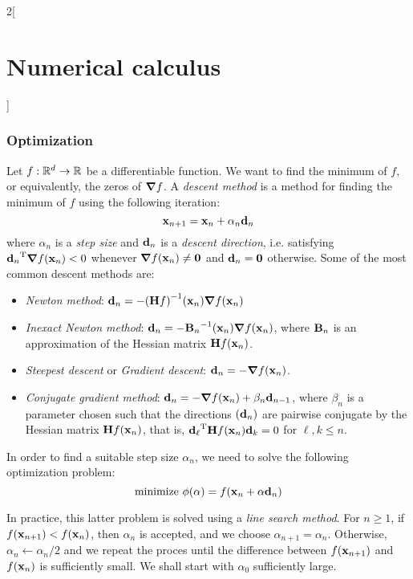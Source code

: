 \documentclass[../../../main_math.tex]{subfiles}
\begin{document}
\begin{multicols}{2}[\section{Numerical calculus}]
  \subsubsection{Optimization}
  \begin{definition}
    Let $f:\mathbb{R}^d\rightarrow\mathbb{R}$ be a differentiable function. We want to find the minimum of $f$, or equivalently, the zeros of $\grad f$. A \emph{descent method} is a method for finding the minimum of $f$ using the following iteration:
    $$
      \boldsymbol{\mathrm{x}}_{n+1}=\boldsymbol{\mathrm{x}}_n+\alpha_n\boldsymbol{\mathrm{d}}_n
    $$
    where $\alpha_n$ is a \emph{step size} and $\boldsymbol{\mathrm{d}}_n$ is a \emph{descent direction}, i.e. satisfying ${\boldsymbol{\mathrm{d}}_n}^{\mathrm{T}}\grad f(\boldsymbol{\mathrm{x}}_n)<0$ whenever $\grad f(\boldsymbol{\mathrm{x}}_n)\neq\boldsymbol{\mathrm{0}}$ and $\boldsymbol{\mathrm{d}}_n=\boldsymbol{\mathrm{0}}$ otherwise. Some of the most common descent methods are:
    \begin{itemize}
      \item \emph{Newton method}: $\boldsymbol{\mathrm{d}}_n=-{(\boldsymbol{\mathrm{H}}f)}^{-1}(\boldsymbol{\mathrm{x}}_n)\grad f(\boldsymbol{\mathrm{x}}_n)$
      \item \emph{Inexact Newton method}: $\boldsymbol{\mathrm{d}}_n=-{\boldsymbol{\mathrm{B}}_n}^{-1}(\boldsymbol{\mathrm{x}}_n)\grad f(\boldsymbol{\mathrm{x}}_n)$, where $\boldsymbol{\mathrm{B}}_n$ is an approximation of the Hessian matrix $\boldsymbol{\mathrm{H}}f(\boldsymbol{\mathrm{x}}_n)$.
      \item \emph{Steepest descent} or \emph{Gradient descent}: $\boldsymbol{\mathrm{d}}_n=-\grad f(\boldsymbol{\mathrm{x}}_n)$.
      \item \emph{Conjugate gradient method}: $\boldsymbol{\mathrm{d}}_n=-\grad f(\boldsymbol{\mathrm{x}}_n)+\beta_n\boldsymbol{\mathrm{d}}_{n-1}$, where $\beta_n$ is a parameter chosen such that the directions $(\boldsymbol{\mathrm{d}}_n)$ are pairwise conjugate by the Hessian matrix $\boldsymbol{\mathrm{H}}f(\boldsymbol{\mathrm{x}}_n)$, that is, ${\boldsymbol{\mathrm{d}}_\ell}^{\mathrm{T}}\boldsymbol{\mathrm{H}}f(\boldsymbol{\mathrm{x}}_n)\boldsymbol{\mathrm{d}}_{k}=0$ for $\ell, k\leq n$.
    \end{itemize}
    In order to find a suitable step size $\alpha_n$, we need to solve the following optimization problem:
    $$
      \text{minimize } \phi(\alpha)=f(\boldsymbol{\mathrm{x}}_n+\alpha\boldsymbol{\mathrm{d}}_n)
    $$
  \end{definition}
  \begin{remark}
    In practice, this latter problem is solved using a \emph{line search method}. For $n\geq 1$, if $f(\boldsymbol{\mathrm{x}}_{n+1})<f(\boldsymbol{\mathrm{x}}_n)$, then $\alpha_n$ is accepted, and we choose $\alpha_{n+1}=\alpha_n$. Otherwise, $\alpha_{n}\leftarrow\alpha_n/2$ and we repeat the proces until the difference between $f(\boldsymbol{\mathrm{x}}_{n+1})$ and $f(\boldsymbol{\mathrm{x}}_n)$ is sufficiently small. We shall start with $\alpha_0$ sufficiently large.
  \end{remark}
  \begin{definition}

\end{definition}
\end{multicols}
\end{document}
